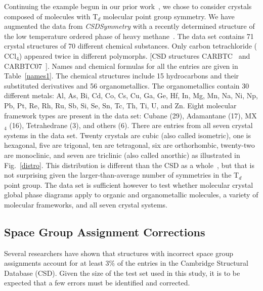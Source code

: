 \documentclass{iucr}              %
\begin{document}
Continuing the example begun in our prior work~\cite{Mettes04}, we chose to consider crystals composed of molecules with T$_d$ molecular point group symmetry.  We have augmented the data from
\emph{CSDSymmetry} with a recently determined structure of the low temperature ordered phase of heavy methane~\cite{Neumann03}.  The data set contains 71 crystal structures of 70 different chemical substances.  Only carbon tetrachloride ($\mathrm{CCl}_4$) appeared twice in different polymorphs. [CSD structures CARBTC~\cite{Piermarini73} and CARBTC07~\cite{Cohen79}]. Names and chemical formulas for all the entries are given in Table~\ref{names1}. The chemical structures include 15 hydrocarbons and their substituted derivatives and 56 organometallics. The organometallics contain 30 different metals: Al, As, Bi, Cd, Co, Cs, Cu, Ga, Ge, Hf, In, Mg, Mn, Na, Ni, Np, Pb, Pt, Re, Rh, Ru, Sb, Si, Se, Sn, Tc, Th, Ti, U, and Zn. Eight molecular framework types are present in the data set: Cubane (29), Adamantane (17), MX$_4$ (16), Tetrahedrane (3), and others (6). There are entries from all seven crystal systems in the data set. Twenty crystals are cubic (also called isometric), one is hexagonal, five are trigonal, ten are tetragonal, six are orthorhombic, twenty-two are monoclinic, and seven are triclinic (also called anorthic) as illustrated in Fig.~\ref{distro}. This distribution is different than the CSD as a whole~\cite{Bauer92}, but that is not surprising given the larger-than-average number of symmetries in the T$_d$ point group.  The data set is sufficient however to test whether molecular crystal global phase diagrams apply to organic and organometallic molecules, a variety of molecular frameworks, and all seven crystal systems.



\subsection{Space Group Assignment Corrections}

Several researchers have shown that structures with incorrect space group assignments account for at least 3\% of the entries in the Cambridge Structural Database (CSD).\cite{Baur86,Marsh95}  Given the size of the test set used in this study, it is to be expected that a few errors must be identified and corrected.
\end{document}

